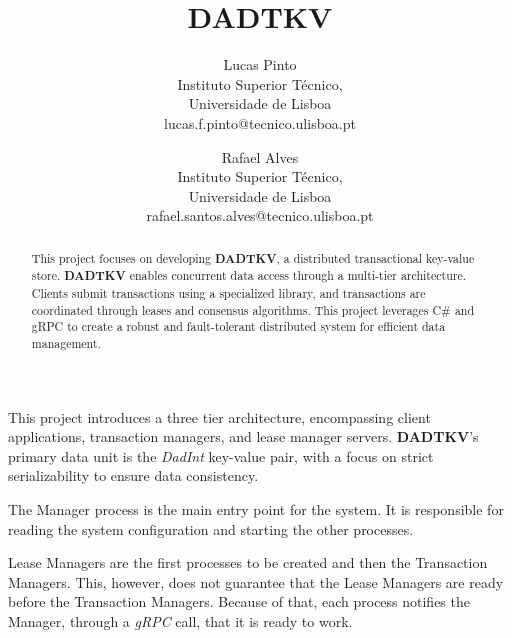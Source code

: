 \documentclass[times, 10pt,twocolumn]{article}
\begin{document}
\title{DADTKV}

\author{Lucas Pinto\\
Instituto Superior Técnico,\\
Universidade de Lisboa\\
lucas.f.pinto@tecnico.ulisboa.pt\\
\and
Rafael Alves\\
Instituto Superior Técnico,\\
Universidade de Lisboa\\ 
rafael.santos.alves@tecnico.ulisboa.pt\\
}

\maketitle
\thispagestyle{empty}

\begin{abstract}
   This project focuses on developing \textbf{DADTKV}, a distributed transactional key-value store.
   \textbf{DADTKV} enables concurrent data access through a multi-tier architecture.
   Clients submit transactions using a specialized library, and transactions are coordinated
   through leases and consensus algorithms. This project leverages C\# and gRPC to create
   a robust and fault-tolerant distributed system for efficient data management.
\end{abstract}




This project introduces a three tier architecture, encompassing client applications,
transaction managers, and lease manager servers. \textbf{DADTKV}'s primary data unit is the \textit{DadInt}
key-value pair, with a focus on strict serializability to ensure data consistency.


The Manager process is the main entry point for the system. It is responsible for reading
the system configuration and starting the other processes.

Lease Managers are the first processes to be created and then the Transaction Managers.
This, however, does not guarantee that the Lease Managers are ready before the Transaction Managers.
Because of that, each process notifies the Manager, through a \textit{gRPC} call, that it is ready to work.
\end{document}
